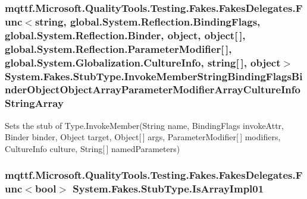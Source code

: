 \hypertarget{class_system_1_1_fakes_1_1_stub_type_a84eb40906faa3e285a4929b6ee6f6ed1}{
\subsubsection[{Invoke\-Member\-String\-Binding\-Flags\-Binder\-Object\-Object\-Array\-Parameter\-Modifier\-Array\-Culture\-Info\-String\-Array}]{\setlength{\rightskip}{0pt plus 5cm}mqttf.\-Microsoft.\-Quality\-Tools.\-Testing.\-Fakes.\-Fakes\-Delegates.\-Func$<$string, global.\-System.\-Reflection.\-Binding\-Flags, global.\-System.\-Reflection.\-Binder, object, object\mbox{[}$\,$\mbox{]}, global.\-System.\-Reflection.\-Parameter\-Modifier\mbox{[}$\,$\mbox{]}, global.\-System.\-Globalization.\-Culture\-Info, string\mbox{[}$\,$\mbox{]}, object$>$ System.\-Fakes.\-Stub\-Type.\-Invoke\-Member\-String\-Binding\-Flags\-Binder\-Object\-Object\-Array\-Parameter\-Modifier\-Array\-Culture\-Info\-String\-Array}}\label{class_system_1_1_fakes_1_1_stub_type_a84eb40906faa3e285a4929b6ee6f6ed1}


Sets the stub of Type.\-Invoke\-Member(\-String name, Binding\-Flags invoke\-Attr, Binder binder, Object target, Object\mbox{[}$\,$\mbox{]} args, Parameter\-Modifier\mbox{[}$\,$\mbox{]} modifiers, Culture\-Info culture, String\mbox{[}$\,$\mbox{]} named\-Parameters)

\hypertarget{class_system_1_1_fakes_1_1_stub_type_a0018fb8f6dc2ce66e686666c4e4315d7}{
\subsubsection[{Is\-Array\-Impl01}]{\setlength{\rightskip}{0pt plus 5cm}mqttf.\-Microsoft.\-Quality\-Tools.\-Testing.\-Fakes.\-Fakes\-Delegates.\-Func$<$bool$>$ System.\-Fakes.\-Stub\-Type.\-Is\-Array\-Impl01}}\label{class_system_1_1_fakes_1_1_stub_type_a0018fb8f6dc2ce66e686666c4e4315d7}



